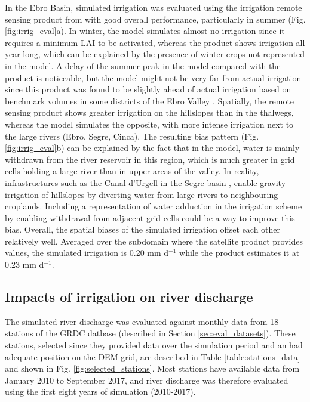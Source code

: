 In the Ebro Basin, simulated irrigation was evaluated using the irrigation remote sensing product from \cite{dari_regional_2023} with good overall performance, particularly in summer (Fig. \ref{fig:irrig_eval}a).
In winter, the model simulates almost no irrigation since it requires a minimum LAI to be activated, whereas the product shows irrigation all year long, which can be explained by the presence of winter crops not represented in the model.
A delay of the summer peak in the model compared with the product is noticeable, but the model might not be very far from actual irrigation since this product was found to be slightly ahead of actual irrigation based on benchmark volumes in some districts of the Ebro Valley \citep[Fig. 5 in][]{dari_regional_2023}.
Spatially, the remote sensing product shows greater irrigation on the hillslopes than in the thalwegs, whereas the model simulates the opposite, with more intense irrigation next to the large rivers (Ebro, Segre, Cinca).
The resulting bias pattern (Fig. \ref{fig:irrig_eval}b) can be explained by the fact that in the model, water is mainly withdrawn from the river reservoir in this region, which is much greater in grid cells holding a large river than in upper areas of the valley. In reality, infrastructures such as the Canal d'Urgell in the Segre basin \citep{farran_urgell_2024}, enable gravity irrigation of hillslopes by diverting water from large rivers to neighbouring croplands. Including a representation of water adduction in the irrigation scheme by enabling withdrawal from adjacent grid cells could be a way to improve this bias.
Overall, the spatial biases of the simulated irrigation offset each other relatively well. Averaged over the subdomain where the satellite product provides values, the simulated irrigation is 0.20 mm d$^{-1}$ while the product estimates it at 0.23 mm d$^{-1}$.

\subsection{Impacts of irrigation on river discharge}

The simulated river discharge was evaluated against monthly data from 18 stations of the GRDC datbase (described in Section \ref{sec:eval_datasets}).
These stations, selected since they provided data over the simulation period and an had adequate position on the DEM grid, are described in Table \ref{table:stations_data} and shown in Fig. \ref{fig:selected_stations}. Most stations have available data from January 2010 to September 2017, and river discharge was therefore evaluated using the first eight years of simulation (2010-2017).


